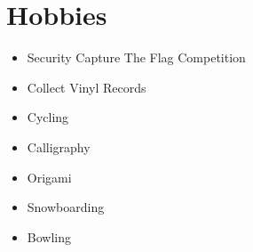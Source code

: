 \documentclass[letterpaper]{article}
\begin{document}
\section{Hobbies}
\label{sec:org15fde52}
\begin{itemize}
\item Security Capture The Flag Competition
\item Collect Vinyl Records
\item Cycling
\item Calligraphy
\item Origami
\item Snowboarding
\item Bowling
\end{itemize}
\end{document}

